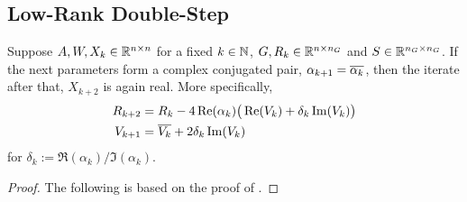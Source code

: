 \subsection{Low-Rank Double-Step}

\begin{proposition}
\label{thm:adi:ale:complex-pair}
  Suppose $A, W, X_k\in\mathbb{R}^{n\times n}$ for a fixed $k\in\mathbb{N}$,
  \ie $G, R_k \in \mathbb{R}^{n\times n_G}$ and $S\in\mathbb{R}^{n_G\times n_G}$.
  If the next parameters form a complex conjugated pair,
  $\alpha_{k+1} = \conj{\alpha_k}$,
  then the iterate after that, $X_{k+2}$ is again real.
  More specifically,
  \begin{align*}
    R_{k+2} &= R_k - 4\Re(\alpha_k) \big(
      \Re(V_k) + \delta_k \Im(V_k)
    \big) \\
    V_{k+1} &= \conj{V_k} + 2\delta_k \Im(V_k)
  \end{align*}
  for $\delta_k := \Re(\alpha_k) / \Im(\alpha_k)$.
\end{proposition}
\begin{proof}
  The following is based on the proof of \cite[Theorem~4.2]{Kuerschner2016}.
\end{proof}

